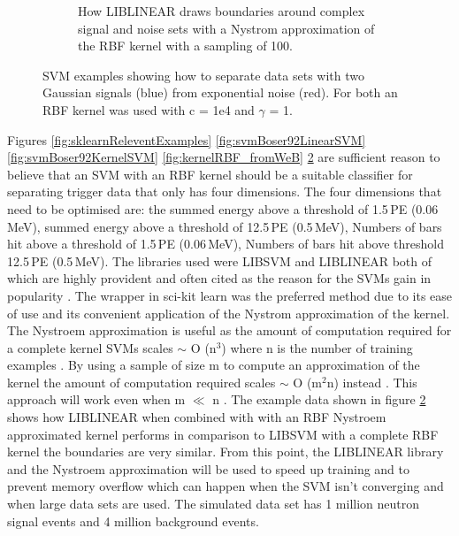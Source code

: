 \begin{figure}[!h]
\begin{subfigure}{.5\textwidth}
  \captionsetup{width=.9\linewidth}
  \caption{How LIBLINEAR draws boundaries around complex signal and noise sets with a Nystrom approximation of the RBF kernel with a sampling of 100.}
  \label{subFig:exp_2NysGaussExample}
\end{subfigure}
\caption{SVM examples showing how to separate data sets with two Gaussian signals (blue) from exponential noise (red). For both an RBF kernel was used with c = 1e4 and $\gamma$ = 1.}
\label{fig:svmExp_GausseExamples}
\end{figure}

Figures \ref{fig:sklearnReleventExamples} \ref{fig:svmBoser92LinearSVM} \ref{fig:svmBoser92KernelSVM} \ref{fig:kernelRBF_fromWeB} \ref{fig:svmExp_GausseExamples} are sufficient reason to believe that an SVM with an RBF kernel should be a suitable classifier for separating trigger data that only has four dimensions. The four dimensions that need to be optimised are: the summed energy above a threshold of 1.5\,PE (0.06\,MeV), summed energy above a threshold of 12.5\,PE (0.5\,MeV), Numbers of bars hit above a threshold of 1.5\,PE (0.06\,MeV), Numbers of bars hit above threshold 12.5\,PE (0.5\,MeV). The libraries used were LIBSVM and LIBLINEAR both of which are highly provident and often cited as the reason for the SVMs gain in popularity \cite{chang2011libsvm} \cite{fan2008liblinear} \cite{murty2016support}. The wrapper in sci-kit learn was the preferred method due to its ease of use and its convenient application of the Nystrom approximation \cite{williams2001using} of the kernel. The Nystroem approximation is useful as the amount of computation required for a complete kernel SVMs scales $\sim$ O (n$^3$) where n is the number of training examples \cite{williams2001using}. By using a sample of size m to compute an approximation of the kernel the amount of computation required scales $\sim$ O (m$^2$n) instead \cite{williams2001using}. This approach will work even when m $\ll$ n \cite{williams2001using}. The example data shown in figure \ref{fig:svmExp_GausseExamples} shows how LIBLINEAR when combined with with an RBF Nystroem approximated kernel performs in comparison to LIBSVM with a complete RBF kernel the boundaries are very similar. From this point, the LIBLINEAR library and the Nystroem approximation will be used to speed up training and to prevent memory overflow which can happen when the SVM isn't converging and when large data sets are used. The simulated data set has 1 million neutron signal events and 4 million background events.
